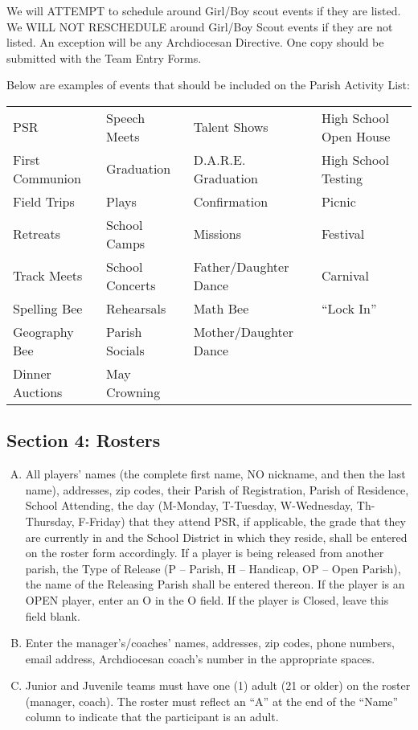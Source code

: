 \documentclass[letteraper,10pt,oneside,draft]{memoir}
\begin{document}
We will ATTEMPT to schedule around Girl/Boy scout events if they are listed.  We WILL NOT RESCHEDULE around Girl/Boy Scout events if they are not listed.  An exception will be any Archdiocesan Directive. 
One copy should be submitted with the Team Entry Forms.

Below are examples of events that should be included on the Parish Activity List:

\begin{center}
    \begin{tabular}{>{\small}l >{\small}l >{\small}l >{\small}l}
        PSR & Speech Meets & Talent Shows & High School Open House \\
        First Communion & Graduation & D.A.R.E. Graduation & High School Testing \\
        Field Trips	& Plays & Confirmation & Picnic \\
        Retreats & School Camps & Missions & Festival \\
        Track Meets	& School Concerts & Father/Daughter Dance & Carnival \\
        Spelling Bee & Rehearsals & Math Bee & “Lock In” \\
        Geography Bee & Parish Socials & Mother/Daughter Dance	\\
        Dinner	Auctions & May Crowning & & \\
    \end{tabular}
\end{center}

\subsection{Section 4: Rosters}
\begin{enumerate}[A.]
    \item All players’ names (the complete first name, NO nickname, and then the last name), addresses, zip codes, their Parish of Registration, Parish of Residence, School Attending, the day (M-Monday, T-Tuesday, W-Wednesday, Th-Thursday, F-Friday) that they attend PSR, if applicable, the grade that they are currently in and the School District in which they reside, shall be entered on the roster form accordingly.  If a player is being released from another parish, the Type of Release (P – Parish, H – Handicap, OP – Open Parish), the name of the Releasing Parish shall be entered thereon.  If the player is an OPEN player, enter an O in the O field.  If the player is Closed, leave this field blank.
    \item Enter the manager’s/coaches’ names, addresses, zip codes, phone numbers, email address, Archdiocesan coach’s number in the appropriate spaces.
    \item Junior and Juvenile teams must have one (1) adult (21 or older) on the roster (manager, coach).  The roster must reflect an ``A'' at the end of the ``Name'' column to indicate that the participant is an adult.
\end{enumerate}
\end{document}
